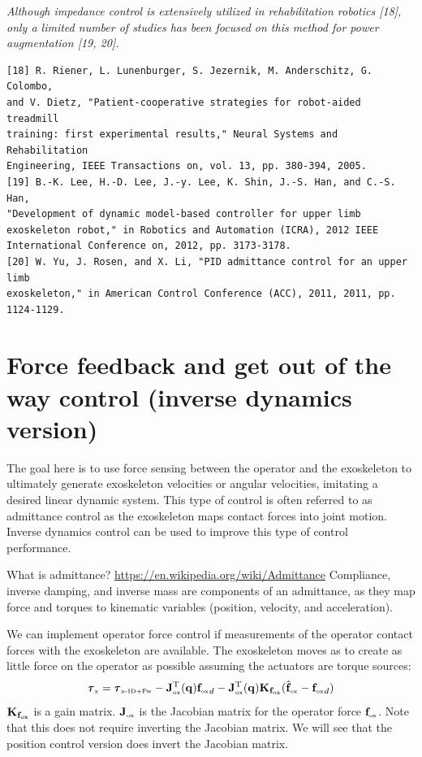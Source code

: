 \documentclass[letterpaper,12pt,fullpage]{article}
\newcommand{\myx}{{\mbox {\tiny x}}}
\newcommand{\ox}{{\mbox {\tiny ox}}}
\newcommand{\xinvdynw}{{\mbox {\tiny x-ID+Fw}}}
\begin{document}
{\it Although impedance control is extensively utilized in rehabilitation
robotics [18], only a limited number of studies has been focused on
this method for power augmentation [19, 20].}
\begin{verbatim}
[18] R. Riener, L. Lunenburger, S. Jezernik, M. Anderschitz, G. Colombo,
and V. Dietz, "Patient-cooperative strategies for robot-aided treadmill
training: first experimental results," Neural Systems and Rehabilitation
Engineering, IEEE Transactions on, vol. 13, pp. 380-394, 2005.
[19] B.-K. Lee, H.-D. Lee, J.-y. Lee, K. Shin, J.-S. Han, and C.-S. Han,
"Development of dynamic model-based controller for upper limb
exoskeleton robot," in Robotics and Automation (ICRA), 2012 IEEE
International Conference on, 2012, pp. 3173-3178.
[20] W. Yu, J. Rosen, and X. Li, "PID admittance control for an upper limb
exoskeleton," in American Control Conference (ACC), 2011, 2011, pp.
1124-1129.
\end{verbatim}

\section{Force feedback and get out of the way control (inverse dynamics version)}

The goal here is to use force sensing between the operator and the
exoskeleton to ultimately generate exoskeleton velocities or angular velocities,
imitating a desired linear dynamic system.
This type of control is often referred to as admittance control as the
exoskeleton maps contact forces into joint motion.
Inverse dynamics control
can be used to improve this type of control performance.

What is admittance?
\url{https://en.wikipedia.org/wiki/Admittance}
Compliance, inverse damping, and inverse mass are components of an admittance,
as they map force and torques to kinematic variables (position, velocity, and
acceleration). 

We can implement operator force control 
if measurements of the operator contact forces with
the exoskeleton are available.
The exoskeleton moves as to create as little force on the operator as possible 
assuming the actuators are torque sources:
\begin{equation}
\vtau_{\myx} = \vtau_{\xinvdynw} - \mJ_{\ox}^{\tr}(\vq) {\vf_{\ox}}_d
- \mJ_{\ox}^{\tr}(\vq) \mK_{\vf_{\ox}} ( \hat{\vf}_{\ox} - {\vf_{\ox}}_d )
\end{equation}
$\mK_{\vf_{\ox}}$ is a gain matrix. $\mJ_{\ox}$ is the Jacobian matrix for the operator
force $\vf_{\ox}$.
Note that this does not require inverting the Jacobian matrix.
We will see that the position control version does invert the Jacobian matrix.
\end{document}
